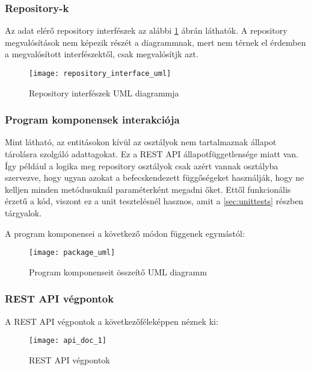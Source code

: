 \clearpage

\subsubsection{Repository-k}

Az adat elérő repository interfészek az alábbi \ref{fig:repoInterfaces} ábrán láthatók.
A repository megvalósítások nem képezik részét a diagrammnak, mert nem térnek el érdemben a megvalósított interfészektől, csak megvalósítjk azt.

\begin{figure}[H]
	\centering
	\texttt{[image: repository\_interface\_uml]}
	\caption{Repository interfészek UML diagrammja}
	\label{fig:repoInterfaces}
\end{figure}

\clearpage

\subsubsection{Program komponensek interakciója}

Mint látható, az entitásokon kívül az osztályok nem tartalmaznak állapot tárolásra szolgáló adattagokat. Ez a REST API állapotfüggetlensége miatt van. Így például a logika meg repository osztályok csak azért vannak osztályba szervezve, hogy ugyan azokat a befecskendezett függőségeket használják, hogy ne kelljen minden metódusuknál paraméterként megadni őket. Ettől funkcionális érzetű a kód, viszont ez a unit tesztelésnél hasznos, amit a \ref{sec:unittests} részben tárgyalok.

A program komponensei a következő módon függenek egymástól:

\begin{figure}[H]
	\centering
	\texttt{[image: package\_uml]}
	\caption{Program komponenseit összeítő UML diagramm}
	\label{fig:package}
\end{figure}


\clearpage

\subsubsection{REST API végpontok}

A REST API végpontok a következőféleképpen néznek ki:

\begin{figure}[H]
	\centering
	\texttt{[image: api\_doc\_1]}
	\caption{REST API végpontok}
	\label{fig:apiDoc1}
\end{figure}

